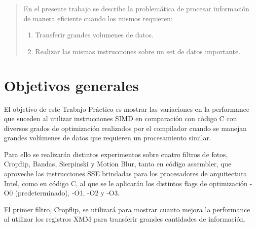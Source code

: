 \documentclass[a4paper]{article}
\begin{document}
\thispagestyle{empty}

\maketitle
\newpage

\thispagestyle{empty}
\vfill
\begin{abstract}
En el presente trabajo se describe la problemática de procesar información de manera eficiente cuando los mismos requieren:
\begin{enumerate}
\item Transferir grandes volumenes de datos.
\item Realizar las mismas instrucciones sobre un set de datos importante.
\end{enumerate}

\end{abstract}

\thispagestyle{empty}
\vspace{3cm}
\tableofcontents
\newpage

\newpage

\section{Objetivos generales}

El objetivo de este Trabajo Práctico es mostrar las variaciones en la performance que suceden al utilizar instrucciones SIMD en comparación con código C con diversos grados de optimización realizados por el compilador cuando se manejan grandes volúmenes de datos que requieren un procesamiento similar.

Para ello se realizarán distintos experimentos sobre cuatro filtros de fotos, Cropflip, Bandas, Sierpinski y Motion Blur, tanto en código assembler, que aproveche las instrucciones SSE brindadas para los procesadores de arquitectura Intel, como en código C, al que se le aplicarán los distintos flags de optimización -O0 (predeterminado), -O1, -O2 y -O3.

El primer filtro, Cropflip, se utilizará para mostrar cuanto mejora la performance al utilizar los registros XMM para transferir grandes cantidades de información.
\end{document}
